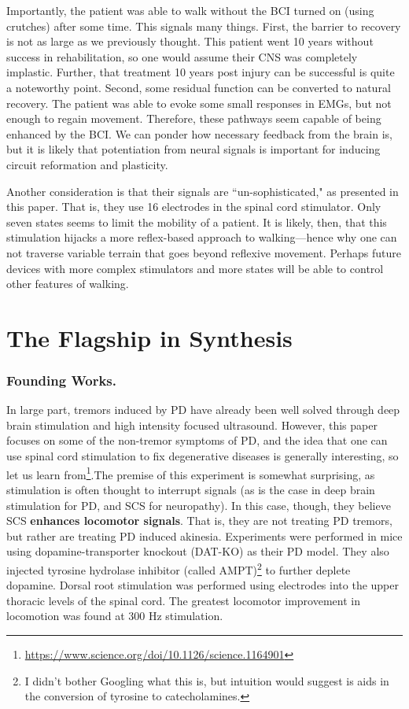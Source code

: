 Importantly, the patient was able to walk without the BCI turned on (using crutches) after some time. This signals many things. First, the barrier to recovery is not as large as we previously thought. This patient went 10 years without success in rehabilitation, so one would assume their CNS was completely implastic. Further, that treatment 10 years post injury can be successful is quite a noteworthy point. Second, some residual function can be converted to natural recovery. The patient was able to evoke some small responses in EMGs, but not enough to regain movement. Therefore, these pathways seem capable of being enhanced by the BCI. We can ponder how necessary feedback from the brain is, but it is likely that potentiation from neural signals is important for inducing circuit reformation and plasticity.\newline

 Another consideration is that their signals are ``un-sophisticated," as presented in this paper.  That is, they use 16 electrodes in the spinal cord stimulator. Only seven states seems to limit the mobility of a patient. It is likely, then, that this stimulation hijacks a more reflex-based approach to walking---hence why one can not traverse variable terrain that goes beyond reflexive movement. Perhaps future devices with more complex stimulators and more states will be able to control other features of walking. 


\section{The Flagship in Synthesis}

\subsubsection{Founding Works.}

In large part, tremors induced by PD have already been well solved through deep brain stimulation and high intensity focused ultrasound. However, this paper focuses on some of the non-tremor symptoms of PD, and the idea that one can use spinal cord stimulation to fix degenerative diseases is generally interesting, so let us learn from\footnote{\url{https://www.science.org/doi/10.1126/science.1164901}}.The premise of this experiment is somewhat surprising, as stimulation is often thought to interrupt signals (as is the case in deep brain stimulation for PD, and SCS for neuropathy). In this case, though, they believe SCS \textbf{enhances locomotor signals}. That is, they are not treating PD tremors, but rather are treating PD induced akinesia. Experiments were performed in mice using dopamine-transporter knockout (DAT-KO) as their PD model. They also injected tyrosine hydrolase inhibitor (called AMPT)\footnote{I didn't bother Googling what this is, but intuition would suggest is aids in the conversion of tyrosine to catecholamines.} to further deplete dopamine. Dorsal root stimulation was performed using electrodes into the upper thoracic levels of the spinal cord. The greatest locomotor improvement in locomotion was found at 300 Hz stimulation.\newline

